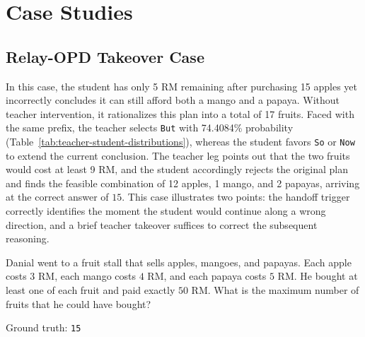 \documentclass{article} %
\begin{document}


\clearpage
\section{Case Studies}\label{app:case-studies}

\subsection{Relay-OPD Takeover Case}\label{app:takeover-case}

In this case, the student has only 5 RM remaining after purchasing 15 apples yet incorrectly concludes it can still afford both a mango and a papaya. Without teacher intervention, it rationalizes this plan into a total of 17 fruits. Faced with the same prefix, the teacher selects \texttt{But} with 74.4084\% probability (Table~\ref{tab:teacher-student-distributions}), whereas the student favors \texttt{So} or \texttt{Now} to extend the current conclusion. The teacher leg points out that the two fruits would cost at least 9 RM, and the student accordingly rejects the original plan and finds the feasible combination of 12 apples, 1 mango, and 2 papayas, arriving at the correct answer of $15$. This case illustrates two points: the handoff trigger correctly identifies the moment the student would continue along a wrong direction, and a brief teacher takeover suffices to correct the subsequent reasoning.\par

\begin{promptbox}[title={Problem}, breakable=false]
\small
Danial went to a fruit stall that sells apples, mangoes, and papayas. Each apple costs $3$ RM, each mango costs $4$ RM, and each papaya costs $5$ RM. He bought at least one of each fruit and paid exactly $50$ RM. What is the maximum number of fruits that he could have bought?\par
\smallskip
Ground truth: \texttt{15}
\end{promptbox}
\end{document}
